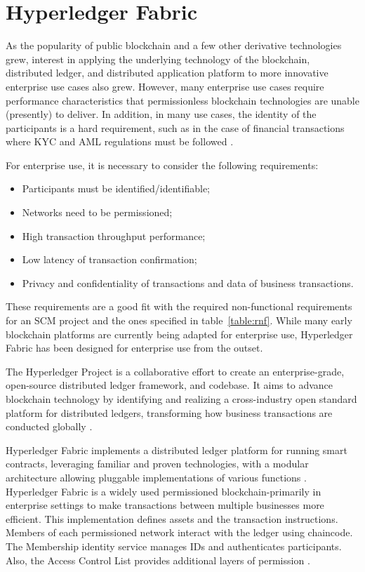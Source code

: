 \section{Hyperledger Fabric}\label{sec:hyperledger}

As the popularity of public blockchain and a few other derivative technologies grew, interest in applying the underlying technology of the blockchain, distributed ledger, and distributed application platform to more innovative enterprise use cases also grew. However, many enterprise use cases require performance characteristics that permissionless blockchain technologies are unable (presently) to deliver. In addition, in many use cases, the identity of the participants is a hard requirement, such as in the case of financial transactions where \ac{KYC} and \ac{AML} regulations must be followed \cite{POLGE2020}.

For enterprise use, it is necessary to consider the following requirements:

\begin{itemize}
\item Participants must be identified/identifiable;
\item Networks need to be permissioned;
\item High transaction throughput performance;
\item Low latency of transaction confirmation;
\item Privacy and confidentiality of transactions and data of business transactions.
\end{itemize}

These requirements are a good fit with the required non-functional requirements for an SCM project and the ones specified in table~\ref{table:rnf}. While many early blockchain platforms are currently being adapted for enterprise use, Hyperledger Fabric has been designed for enterprise use from the outset. 

The Hyperledger Project is a collaborative effort to create an enterprise-grade, open-source distributed ledger framework, and codebase. It aims to advance blockchain technology by identifying and realizing a cross-industry open standard platform for distributed ledgers, transforming how business transactions are conducted globally \cite{cachin2016architecture}.

Hyperledger Fabric implements a distributed ledger platform for running smart contracts, leveraging familiar and proven technologies, with a modular architecture allowing pluggable implementations of various functions \cite{cachin2016architecture}. Hyperledger Fabric is a widely used permissioned blockchain-primarily in enterprise settings to make transactions between multiple businesses more efficient. This implementation defines assets and the transaction instructions. Members of each permissioned network interact with the ledger using chaincode. The Membership identity service manages IDs and authenticates participants. Also, the Access Control List provides additional layers of permission \cite{blockgeeks2018deeper}.

